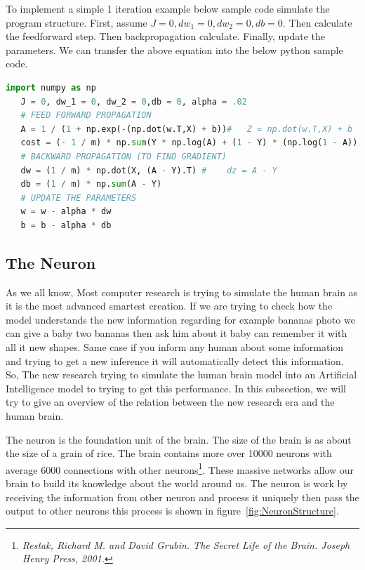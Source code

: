 To implement a simple 1 iteration example below sample code simulate the program structure. First,  assume $J = 0, dw_1 = 0, dw_2 = 0,db = 0$. Then calculate the feedforward step. Then backpropagation calculate. Finally, update the parameters. We can transfer the above equation into the below python sample code. 
 \begin{lstlisting}[language=Python]
   import numpy as np
   J = 0, dw_1 = 0, dw_2 = 0,db = 0, alpha = .02
   # FEED FORWARD PROPAGATION
   A = 1 / (1 + np.exp(-(np.dot(w.T,X) + b))#   Z = np.dot(w.T,X) + b
   cost = (- 1 / m) * np.sum(Y * np.log(A) + (1 - Y) * (np.log(1 - A)))
   # BACKWARD PROPAGATION (TO FIND GRADIENT)
   dw = (1 / m) * np.dot(X, (A - Y).T) #    dz = A - Y
   db = (1 / m) * np.sum(A - Y)
   # UPDATE THE PARAMETERS
   w = w - alpha * dw
   b = b - alpha * db
 \end{lstlisting}

\newpage 
 \subsection{The Neuron}

 As we all know, Most computer research is trying to simulate the human brain as it is the most advanced smartest creation. If we are trying to check how the model understands the new information regarding for example bananas photo we can give a baby two bananas then ask him about it baby can remember it with all it new shapes. Same case if you inform any human about some information and trying to get a new inference it will automatically detect this information. So, The new research trying to simulate the human brain model into an Artificial Intelligence model to trying to get this performance. In this subsection, we will try to give an overview of the relation between the new research era and the human brain.
 
 The neuron is the foundation unit of the brain. The size of the brain is as about the size of a grain of rice. The brain contains more over 10000 neurons with average 6000 connections with other neurons\footnote{\textit{Restak, Richard M. and David Grubin. The Secret Life of the Brain. Joseph Henry Press, 2001.}}.  These massive networks allow our brain to build its knowledge about the world around us. The neuron is work by receiving the information from other neuron and process it uniquely then pass the output to other neurons this process is shown in figure~\ref{fig:NeuronStructure}.

